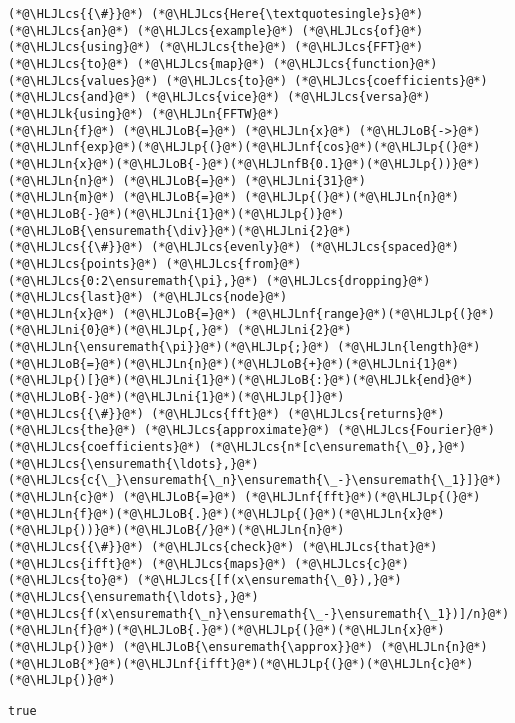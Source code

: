 \documentclass[12pt,a4paper]{article}
\newcommand{\HLJLk}[1]{\textcolor[RGB]{148,91,176}{\textbf{#1}}}
\newcommand{\HLJLn}[1]{#1}
\newcommand{\HLJLnf}[1]{\textcolor[RGB]{66,102,213}{#1}}
\newcommand{\HLJLnfB}[1]{\textcolor[RGB]{59,151,46}{#1}}
\newcommand{\HLJLni}[1]{\textcolor[RGB]{59,151,46}{#1}}
\newcommand{\HLJLoB}[1]{\textcolor[RGB]{102,102,102}{\textbf{#1}}}
\newcommand{\HLJLp}[1]{#1}
\newcommand{\HLJLcs}[1]{\textcolor[RGB]{153,153,119}{\textit{#1}}}
\begin{document}
\begin{lstlisting}
(*@\HLJLcs{{\#}}@*) (*@\HLJLcs{Here{\textquotesingle}s}@*) (*@\HLJLcs{an}@*) (*@\HLJLcs{example}@*) (*@\HLJLcs{of}@*) (*@\HLJLcs{using}@*) (*@\HLJLcs{the}@*) (*@\HLJLcs{FFT}@*) (*@\HLJLcs{to}@*) (*@\HLJLcs{map}@*) (*@\HLJLcs{function}@*) (*@\HLJLcs{values}@*) (*@\HLJLcs{to}@*) (*@\HLJLcs{coefficients}@*) (*@\HLJLcs{and}@*) (*@\HLJLcs{vice}@*) (*@\HLJLcs{versa}@*)
(*@\HLJLk{using}@*) (*@\HLJLn{FFTW}@*)
(*@\HLJLn{f}@*) (*@\HLJLoB{=}@*) (*@\HLJLn{x}@*) (*@\HLJLoB{->}@*) (*@\HLJLnf{exp}@*)(*@\HLJLp{(}@*)(*@\HLJLnf{cos}@*)(*@\HLJLp{(}@*)(*@\HLJLn{x}@*)(*@\HLJLoB{-}@*)(*@\HLJLnfB{0.1}@*)(*@\HLJLp{))}@*)
(*@\HLJLn{n}@*) (*@\HLJLoB{=}@*) (*@\HLJLni{31}@*)
(*@\HLJLn{m}@*) (*@\HLJLoB{=}@*) (*@\HLJLp{(}@*)(*@\HLJLn{n}@*)(*@\HLJLoB{-}@*)(*@\HLJLni{1}@*)(*@\HLJLp{)}@*)(*@\HLJLoB{\ensuremath{\div}}@*)(*@\HLJLni{2}@*)
(*@\HLJLcs{{\#}}@*) (*@\HLJLcs{evenly}@*) (*@\HLJLcs{spaced}@*) (*@\HLJLcs{points}@*) (*@\HLJLcs{from}@*) (*@\HLJLcs{0:2\ensuremath{\pi},}@*) (*@\HLJLcs{dropping}@*) (*@\HLJLcs{last}@*) (*@\HLJLcs{node}@*)
(*@\HLJLn{x}@*) (*@\HLJLoB{=}@*) (*@\HLJLnf{range}@*)(*@\HLJLp{(}@*)(*@\HLJLni{0}@*)(*@\HLJLp{,}@*) (*@\HLJLni{2}@*)(*@\HLJLn{\ensuremath{\pi}}@*)(*@\HLJLp{;}@*) (*@\HLJLn{length}@*)(*@\HLJLoB{=}@*)(*@\HLJLn{n}@*)(*@\HLJLoB{+}@*)(*@\HLJLni{1}@*)(*@\HLJLp{)[}@*)(*@\HLJLni{1}@*)(*@\HLJLoB{:}@*)(*@\HLJLk{end}@*)(*@\HLJLoB{-}@*)(*@\HLJLni{1}@*)(*@\HLJLp{]}@*)
(*@\HLJLcs{{\#}}@*) (*@\HLJLcs{fft}@*) (*@\HLJLcs{returns}@*) (*@\HLJLcs{the}@*) (*@\HLJLcs{approximate}@*) (*@\HLJLcs{Fourier}@*) (*@\HLJLcs{coefficients}@*) (*@\HLJLcs{n*[c\ensuremath{\_0},}@*) (*@\HLJLcs{\ensuremath{\ldots},}@*) (*@\HLJLcs{c{\_}\ensuremath{\_n}\ensuremath{\_-}\ensuremath{\_1}]}@*)
(*@\HLJLn{c}@*) (*@\HLJLoB{=}@*) (*@\HLJLnf{fft}@*)(*@\HLJLp{(}@*)(*@\HLJLn{f}@*)(*@\HLJLoB{.}@*)(*@\HLJLp{(}@*)(*@\HLJLn{x}@*)(*@\HLJLp{))}@*)(*@\HLJLoB{/}@*)(*@\HLJLn{n}@*)
(*@\HLJLcs{{\#}}@*) (*@\HLJLcs{check}@*) (*@\HLJLcs{that}@*) (*@\HLJLcs{ifft}@*) (*@\HLJLcs{maps}@*) (*@\HLJLcs{c}@*) (*@\HLJLcs{to}@*) (*@\HLJLcs{[f(x\ensuremath{\_0}),}@*) (*@\HLJLcs{\ensuremath{\ldots},}@*) (*@\HLJLcs{f(x\ensuremath{\_n}\ensuremath{\_-}\ensuremath{\_1})]/n}@*)
(*@\HLJLn{f}@*)(*@\HLJLoB{.}@*)(*@\HLJLp{(}@*)(*@\HLJLn{x}@*)(*@\HLJLp{)}@*) (*@\HLJLoB{\ensuremath{\approx}}@*) (*@\HLJLn{n}@*)(*@\HLJLoB{*}@*)(*@\HLJLnf{ifft}@*)(*@\HLJLp{(}@*)(*@\HLJLn{c}@*)(*@\HLJLp{)}@*)
\end{lstlisting}

\begin{lstlisting}
true
\end{lstlisting}
\end{document}
